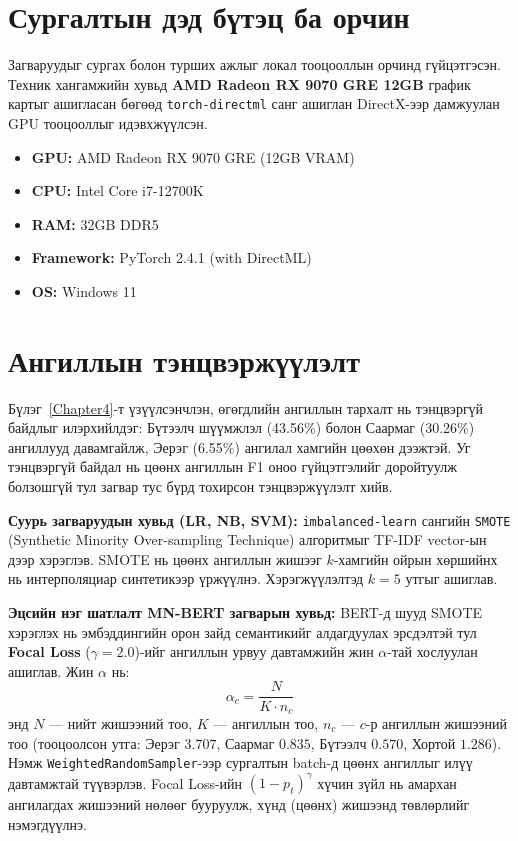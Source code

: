 \section{Сургалтын дэд бүтэц ба орчин}

Загваруудыг сургах болон турших ажлыг локал тооцооллын орчинд гүйцэтгэсэн.
Техник хангамжийн хувьд \textbf{AMD Radeon RX 9070 GRE 12GB} график картыг
ашигласан бөгөөд \texttt{torch-directml} санг ашиглан DirectX-ээр дамжуулан
GPU тооцооллыг идэвхжүүлсэн.

\begin{itemize}
    \item \textbf{GPU:} AMD Radeon RX 9070 GRE (12GB VRAM)
    \item \textbf{CPU:} Intel Core i7-12700K
    \item \textbf{RAM:} 32GB DDR5
    \item \textbf{Framework:} PyTorch 2.4.1 (with DirectML)
    \item \textbf{OS:} Windows 11
\end{itemize}

\section{Ангиллын тэнцвэржүүлэлт}

Бүлэг~\ref{Chapter4}-т үзүүлсэнчлэн, өгөгдлийн ангиллын тархалт нь тэнцвэргүй
байдлыг илэрхийлдэг: Бүтээлч шүүмжлэл (43.56\%) болон Саармаг (30.26\%) ангиллууд
давамгайлж, Эерэг (6.55\%) ангилал хамгийн цөөхөн дээжтэй. Уг тэнцвэргүй байдал нь цөөнх ангиллын F1 оноо
гүйцэтгэлийг доройтуулж болзошгүй тул загвар тус бүрд тохирсон тэнцвэржүүлэлт хийв.

\textbf{Суурь загваруудын хувьд (LR, NB, SVM):} \texttt{imbalanced-learn}
сангийн \texttt{SMOTE} (Synthetic Minority Over-sampling Technique) алгоритмыг
TF-IDF vector-ын дээр хэрэглэв. SMOTE нь цөөнх ангиллын жишээг $k$-хамгийн
ойрын хөршийнх нь интерполяциар синтетикээр үржүүлнэ. Хэрэгжүүлэлтэд
$k\!=\!5$ утгыг ашиглав.

\textbf{Эцсийн нэг шатлалт MN-BERT загварын хувьд:} BERT-д шууд SMOTE хэрэглэх нь
эмбэддингийн орон зайд семантикийг алдагдуулах эрсдэлтэй тул \textbf{Focal Loss}
($\gamma = 2.0$)-ийг ангиллын урвуу давтамжийн жин $\alpha$-тай хослуулан
ашиглав. Жин $\alpha$ нь:
\[
  \alpha_c = \frac{N}{K \cdot n_c}
\]
энд $N$ --- нийт жишээний тоо, $K$ --- ангиллын тоо, $n_c$ --- $c$-р
ангиллын жишээний тоо (тооцоолсон утга: Эерэг $3.707$, Саармаг $0.835$,
Бүтээлч $0.570$, Хортой $1.286$). Нэмж \texttt{WeightedRandomSampler}-ээр
сургалтын batch-д цөөнх ангиллыг илүү давтамжтай түүвэрлэв. Focal Loss-ийн
$(1-p_t)^{\gamma}$ хүчин зүйл нь амархан ангилагдах жишээний нөлөөг бууруулж,
хүнд (цөөнх) жишээнд төвлөрлийг нэмэгдүүлнэ.

